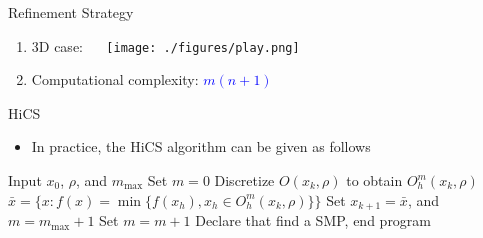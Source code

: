 \documentclass{beamer}
\begin{document}
\begin{frame}{Refinement Strategy}
\begin{itemize}
\begin{enumerate}
		\item 3D case: ~~
	\hspace*{-0.5cm}\texttt{[image: ./figures/play.png]}
	  \vspace{0.5cm}
	\item Computational complexity: \textcolor{blue}{$m(n+1)$}
	\end{enumerate}
\end{itemize}

\end{frame}


\begin{frame}{HiCS}

\begin{itemize}
	\item In practice, the HiCS algorithm can be given as follows
\end{itemize}

\begin{algorithm}[H]
\footnotesize{
	\caption{HiCS}
\begin{algorithmic}[1]
	\STATE Input $x_0$, $\rho$, and $m_{\max}$
		\STATE Set $m=0$
			\STATE Discretize $O(x_k,\rho)$ to obtain $O^m_h(x_k,\rho)$
			\STATE $\bar{x} = \{x: f(x)=\min\{f(x_h), x_h\in O^m_h(x_k, \rho) \} \}$
				\STATE Set $x_{k+1}=\bar{x}$, and $m=m_{\max}+1$
			\ELSE
				\STATE Set $m = m+1$
			\ENDIF
		\ELSE
			\STATE Declare that find a SMP, end program
		\ENDIF
	\ENDFOR
\end{algorithmic}
}
\end{algorithm}
\end{frame}
\end{document}
